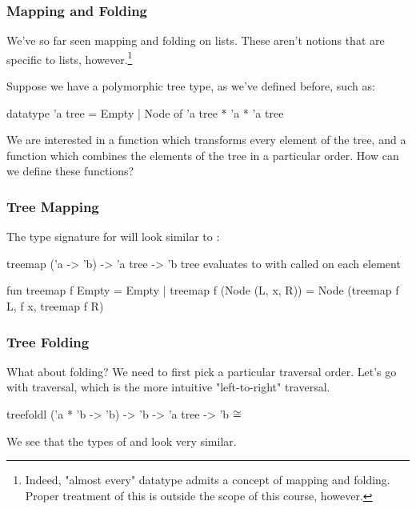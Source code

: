 \documentclass[aspectratio=169, handout]{beamer}
\begin{document}

\begin{frame}[fragile]
  \frametitle{Mapping and Folding}

  \tgs

  We've so far seen mapping and folding on lists. These aren't notions that are
  specific to lists, however.\footnote{
    Indeed, "almost every" datatype admits a concept of mapping and
    folding. Proper treatment of this is outside the scope of this course, however.
  }

  \pause
  \vspace{\fill}

  Suppose we have a polymorphic tree type, as we've defined before, such as:
  \begin{codeblock}
    datatype 'a tree = Empty | Node of 'a tree * 'a * 'a tree
  \end{codeblock}

  \pause
  \vspace{\fill}

  We are interested in a  function which transforms every element of the
  tree, and a  function which combines the elements of the tree in a
  particular order. How can we define these functions?

\end{frame}

\begin{frame}[fragile]
  \frametitle{Tree Mapping}

  The type signature for  will look similar to :

  \pause
  \vspace{\fill}

  \spec
    {treemap}
    {('a -> 'b) -> 'a tree -> 'b tree}
    {}
    { evaluates to  with  called on
    each element}

  \pause
  \vspace{\fill}

  \begin{codeblock}
    fun treemap f Empty = Empty
      | treemap f (Node (L, x, R)) =
          Node (treemap f L, f x, treemap f R)
  \end{codeblock}
\end{frame}

\begin{frame}[fragile]
  \frametitle{Tree Folding}

  What about folding? We need to first pick a particular traversal order. Let's
  go with  traversal, which is the more intuitive "left-to-right"
  traversal.

  \pause
  \vspace{\fill}

  \spec
    {treefoldl}
    {('a * 'b -> 'b) -> 'b -> 'a tree -> 'b}
    {}
    { $\cong$ }

  \pause
  \vspace{\fill}

  We see that the types of  and  look very
  similar.
\end{frame}
\end{document}
